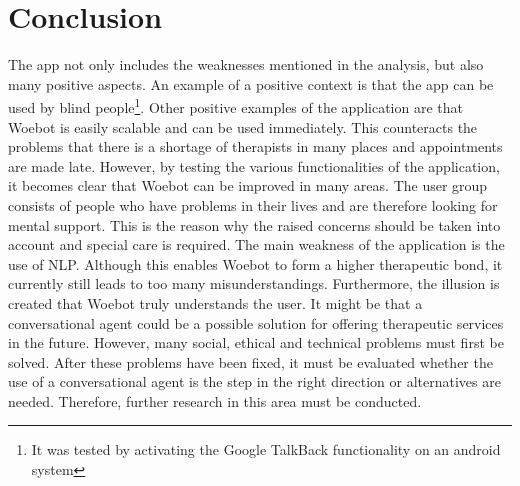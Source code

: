 \section{Conclusion}\label{sec:conclusion}
The app not only includes the weaknesses mentioned in the analysis, but also many positive aspects.
An example of a positive context is that the app can be used by blind people\footnote{It was tested by activating the Google TalkBack functionality on an android system}.
Other positive examples of the application are that Woebot is easily scalable and can be used immediately.
This counteracts the problems that there is a shortage of therapists in many places and appointments are made late.
However, by testing the various functionalities of the application, it becomes clear that Woebot can be improved in many areas.
The user group consists of people who have problems in their lives and are therefore looking for mental support.
This is the reason why the raised concerns should be taken into account and special care is required.
The main weakness of the application is the use of NLP. 
Although this enables Woebot to form a higher therapeutic bond, it currently still leads to too many misunderstandings.
Furthermore, the illusion is created that Woebot truly understands the user.
It might be that a conversational agent could be a possible solution for offering therapeutic services in the future.
However, many social, ethical and technical problems must first be solved.
After these problems have been fixed, it must be evaluated whether the use of a conversational agent is the step in the right direction or alternatives are needed.
Therefore, further research in this area must be conducted.

